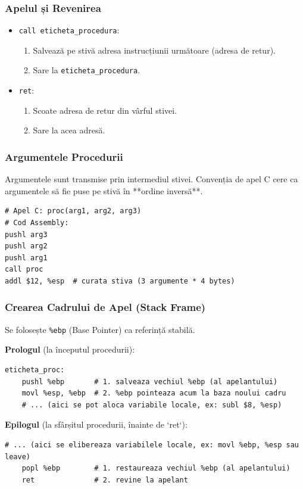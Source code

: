 \documentclass[12pt,a4paper]{article}
\begin{document}
\subsubsection{Apelul și Revenirea}
\begin{itemize}
    \item \texttt{call eticheta\_procedura}:
        \begin{enumerate}
            \item Salvează pe stivă adresa instrucțiunii următoare (adresa de retur).
            \item Sare la \texttt{eticheta\_procedura}.
        \end{enumerate}
    \item \texttt{ret}:
        \begin{enumerate}
            \item Scoate adresa de retur din vârful stivei.
            \item Sare la acea adresă.
        \end{enumerate}
\end{itemize}

\subsubsection{Argumentele Procedurii}
Argumentele sunt transmise prin intermediul stivei. Convenția de apel C cere ca argumentele să fie puse pe stivă în **ordine inversă**.
\begin{lstlisting}[language=x86asm]
# Apel C: proc(arg1, arg2, arg3)
# Cod Assembly:
pushl arg3
pushl arg2
pushl arg1
call proc
addl $12, %esp  # curata stiva (3 argumente * 4 bytes)
\end{lstlisting}

\subsubsection{Crearea Cadrului de Apel (Stack Frame)}
Se folosește \texttt{\%ebp} (Base Pointer) ca referință stabilă.

\textbf{Prologul} (la începutul procedurii):
\begin{lstlisting}[language=x86asm]
eticheta_proc:
    pushl %ebp       # 1. salveaza vechiul %ebp (al apelantului)
    movl %esp, %ebp  # 2. %ebp pointeaza acum la baza noului cadru
    # ... (aici se pot aloca variabile locale, ex: subl $8, %esp)
\end{lstlisting}

\textbf{Epilogul} (la sfârșitul procedurii, înainte de `ret`):
\begin{lstlisting}[language=x86asm]
    # ... (aici se elibereaza variabilele locale, ex: movl %ebp, %esp sau leave)
    popl %ebp        # 1. restaureaza vechiul %ebp (al apelantului)
    ret              # 2. revine la apelant
\end{lstlisting}
\end{document}
